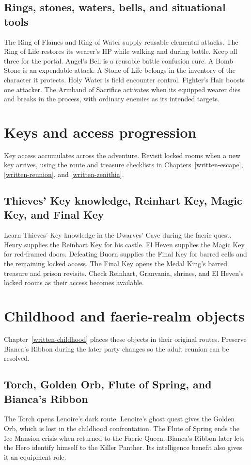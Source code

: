 \subsection{Rings, stones, waters, bells, and situational tools}
The Ring of Flames and Ring of Water supply reusable elemental attacks. The Ring of Life restores its wearer's HP while walking and during battle. Keep all three for the portal. Angel's Bell is a reusable battle confusion cure. A Bomb Stone is an expendable attack. A Stone of Life belongs in the inventory of the character it protects. Holy Water is field encounter control. Fighter's Hair boosts one attacker. The Armband of Sacrifice activates when its equipped wearer dies and breaks in the process, with ordinary enemies as its intended targets.

\section{Keys and access progression}
Key access accumulates across the adventure. Revisit locked rooms when a new key arrives, using the route and treasure checklists in Chapters~\ref{written-escape}, \ref{written-reunion}, and \ref{written-zenithia}.

\subsection{Thieves' Key knowledge, Reinhart Key, Magic Key, and Final Key}
Learn Thieves' Key knowledge in the Dwarves' Cave during the faerie quest. Henry supplies the Reinhart Key for his castle. El Heven supplies the Magic Key for red-framed doors. Defeating Buorn supplies the Final Key for barred cells and the remaining locked access. The Final Key opens the Medal King's barred treasure and prison revisits. Check Reinhart, Granvania, shrines, and El Heven's locked rooms as their access becomes available.

\section{Childhood and faerie-realm objects}
Chapter~\ref{written-childhood} places these objects in their original routes. Preserve Bianca's Ribbon during the later party changes so the adult reunion can be resolved.

\subsection{Torch, Golden Orb, Flute of Spring, and Bianca's Ribbon}
The Torch opens Lenoire's dark route. Lenoire's ghost quest gives the Golden Orb, which is lost in the childhood confrontation. The Flute of Spring ends the Ice Mansion crisis when returned to the Faerie Queen. Bianca's Ribbon later lets the Hero identify himself to the Killer Panther. Its intelligence benefit also gives it an equipment role.

